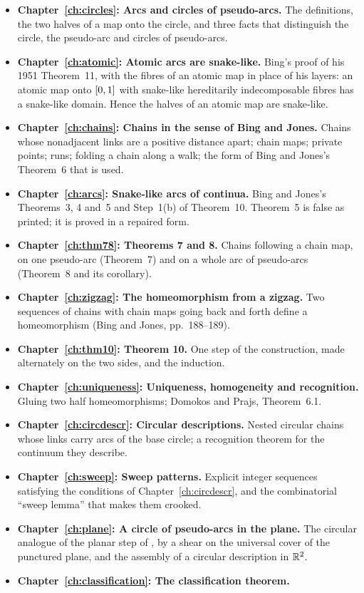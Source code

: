 \begin{itemize}
\item \textbf{Chapter~\ref{ch:circles}: Arcs and circles of pseudo-arcs.} The definitions, the two halves of a map onto the circle, and three facts that
distinguish the circle, the pseudo-arc and circles of pseudo-arcs.
\item \textbf{Chapter~\ref{ch:atomic}: Atomic arcs are snake-like.} Bing's proof of his 1951 Theorem~11, with the fibres of an atomic map in place of his
layers: an atomic map onto $[0,1]$ with snake-like hereditarily indecomposable fibres has a snake-like domain. Hence the halves of an atomic map are
snake-like.
\item \textbf{Chapter~\ref{ch:chains}: Chains in the sense of Bing and Jones.} Chains whose nonadjacent links are a positive distance apart; chain maps;
private points; runs; folding a chain along a walk; the form of Bing and Jones's Theorem~6 that is used.
\item \textbf{Chapter~\ref{ch:arcs}: Snake-like arcs of continua.} Bing and Jones's Theorems~3, 4 and~5 and Step~1(b) of Theorem~10. Theorem~5 is false
as printed; it is proved in a repaired form.
\item \textbf{Chapter~\ref{ch:thm78}: Theorems 7 and 8.} Chains following a chain map, on one pseudo-arc (Theorem~7) and on a whole arc of pseudo-arcs
(Theorem~8 and its corollary).
\item \textbf{Chapter~\ref{ch:zigzag}: The homeomorphism from a zigzag.} Two sequences of chains with chain maps going back and forth define a
homeomorphism (Bing and Jones, pp.~188--189).
\item \textbf{Chapter~\ref{ch:thm10}: Theorem 10.} One step of the construction, made alternately on the two sides, and the induction.
\item \textbf{Chapter~\ref{ch:uniqueness}: Uniqueness, homogeneity and recognition.} Gluing two half homeomorphisms; Domokos and Prajs, Theorem~6.1.
\item \textbf{Chapter~\ref{ch:circdescr}: Circular descriptions.} Nested circular chains whose links carry arcs of the base circle; a recognition theorem
for the continuum they describe.
\item \textbf{Chapter~\ref{ch:sweep}: Sweep patterns.} Explicit integer sequences satisfying the conditions of Chapter~\ref{ch:circdescr}, and the
combinatorial ``sweep lemma'' that makes them crooked.
\item \textbf{Chapter~\ref{ch:plane}: A circle of pseudo-arcs in the plane.} The circular analogue of the planar step of , by a
shear on the universal cover of the punctured plane, and the assembly of a circular description in $\mathbb{R}^2$.
\item \textbf{Chapter~\ref{ch:classification}: The classification theorem.}
\end{itemize}

